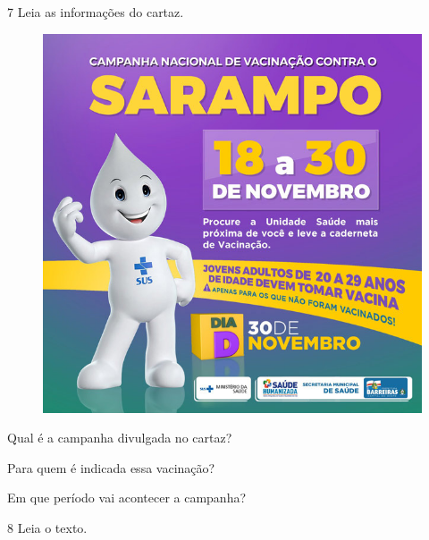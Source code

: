 \num{7} Leia as informações do cartaz.


\begin{figure}[htpb!]
\centering
\includegraphics[width=.5\textwidth]{media/image85.jpeg}
\end{figure}


\begin{escolha}
\item Qual é a campanha divulgada no cartaz?


\item Para quem é indicada essa vacinação?


\item Em que período vai acontecer a campanha?
	
\end{escolha}

\num{8} Leia o texto.


